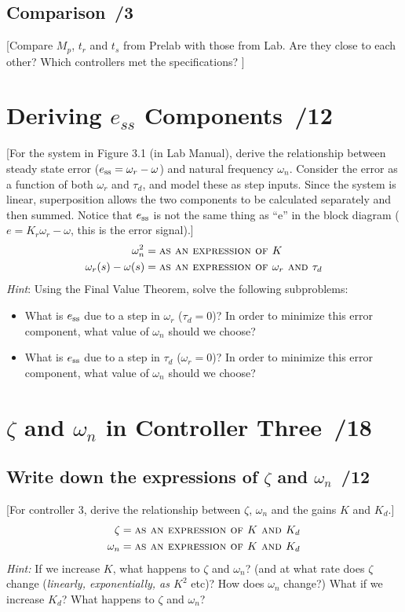 \documentclass{article}
\newcommand{\score}{\hfill \underline{\hspace{0.65cm}}\,/} %
\begin{document}
\subsection{Comparison \score 3}
[Compare $M_p$, $t_r$ and $t_s$ from Prelab with those from Lab. Are they close to each other? Which controllers met the specifications? ]

\section{{\sc Deriving $e_{ss}$ Components} \score 12}
[For the system in Figure 3.1 (in Lab Manual), derive the relationship between steady state error ($e_{\rm ss}= \omega_r - \omega$) and natural frequency $\omega_n$. Consider the error as a function of both $\omega_r$ and $\tau_d$, and model these as step inputs. Since the system is linear, superposition allows the two components to be calculated separately and then summed. Notice that $e_{\rm ss}$ is not the same thing as ``e'' in the block diagram ($e= K_r\omega_r - \omega$, this is the error signal).]
\begin{align*}
  \omega_n^2 & = \mbox{\sc as an expression of $K$} \\
  \omega_r(s) - \omega(s) & = \mbox{\sc as an expression of $\omega_r$ and $\tau_d$}
\end{align*}
\emph{Hint}: Using the Final Value Theorem, solve the following subproblems:
\begin{itemize}
\item What is $e_{\rm ss}$ due to a step in $\omega_r$ ($\tau_d = 0$)? In order to minimize this error component, what value of $\omega_n$ should we choose?
\item What is $e_{\rm ss}$ due to a step in $\tau_d$ ($\omega_r = 0$)? In order to minimize this error component, what value of $\omega_n$ should we choose?
\end{itemize}

\section{{\sc $\zeta$ and $\omega_n$ in Controller Three} \score 18}
\subsection{Write down the expressions of $\zeta$ and $\omega_n$ \score 12}
[For controller 3, derive the relationship between $\zeta$, $\omega_n$ and the gains $K$ and $K_d$.]
\begin{align*}
\zeta & = \mbox{\sc as an expression of $K$ and $K_d$} \\  
\omega_n & = \mbox{\sc as an expression of $K$ and $K_d$}  
\end{align*}
\emph{Hint:} If we increase $K$, what happens to $\zeta$ and $\omega_n$? (and at what rate does $\zeta$ change (\emph{linearly, exponentially, as $K^2$} etc)? How does $\omega_n$ change?) What if we increase $K_d$? What happens to $\zeta$ and $\omega_n$?
\end{document}

